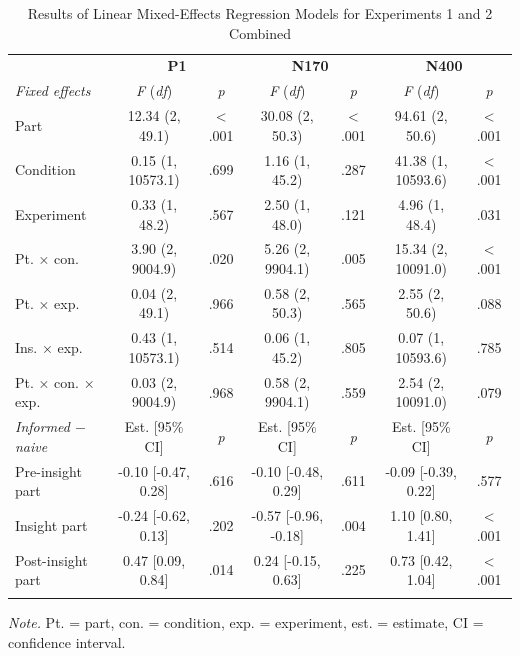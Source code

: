 \documentclass[
  english,
  doc,12pt,twoside,floatsintext]{apa7}
\begin{document}
\begin{table}[tbp]

\begin{center}
\begin{threeparttable}

\caption{\label{tab:joint-table}Results of Linear Mixed-Effects Regression Models for Experiments 1 and 2 Combined\smallskip}

\footnotesize{

\begin{tabular}{lcccccc}
\toprule
 & \multicolumn{2}{c}{\textbf{P1}} & \multicolumn{2}{c}{\textbf{N170}} & \multicolumn{2}{c}{\textbf{N400}} \\
\cmidrule(r){2-3} \cmidrule(r){4-5} \cmidrule(r){6-7}
\textit{Fixed effects} & \textit{F} (\textit{df}) & \textit{p} & \textit{F} (\textit{df}) & \textit{p} & \textit{F} (\textit{df}) & \textit{p}\\
\midrule
Part & 12.34 (2, 49.1) & < .001 & 30.08 (2, 50.3) & < .001 & 94.61 (2, 50.6) & < .001\\
Condition & 0.15 (1, 10573.1) & .699 & 1.16 (1, 45.2) & .287 & 41.38 (1, 10593.6) & < .001\\
Experiment & 0.33 (1, 48.2) & .567 & 2.50 (1, 48.0) & .121 & 4.96 (1, 48.4) & .031\\
Pt. × con. & 3.90 (2, 9004.9) & .020 & 5.26 (2, 9904.1) & .005 & 15.34 (2, 10091.0) & < .001\\
Pt. × exp. & 0.04 (2, 49.1) & .966 & 0.58 (2, 50.3) & .565 & 2.55 (2, 50.6) & .088\\
Ins. × exp. & 0.43 (1, 10573.1) & .514 & 0.06 (1, 45.2) & .805 & 0.07 (1, 10593.6) & .785\\
Pt. × con. × exp. & 0.03 (2, 9004.9) & .968 & 0.58 (2, 9904.1) & .559 & 2.54 (2, 10091.0) & .079\\
\textit{Informed $-$  naive} & Est. [95\% CI] & \textit{p} & Est. [95\% CI] & \textit{p} & Est. [95\% CI] & \textit{p}\\ \midrule
Pre-insight part & -0.10 [-0.47, 0.28] & .616 & -0.10 [-0.48, 0.29] & .611 & -0.09 [-0.39, 0.22] & .577\\
Insight part & -0.24 [-0.62, 0.13] & .202 & -0.57 [-0.96, -0.18] & .004 & 1.10 [0.80, 1.41] & < .001\\
Post-insight part & 0.47 [0.09, 0.84] & .014 & 0.24 [-0.15, 0.63] & .225 & 0.73 [0.42, 1.04] & < .001\\
\bottomrule
\addlinespace
\end{tabular}

}

\begin{tablenotes}[para]
\normalsize{\textit{Note.} Pt. = part, con. = condition, exp. = experiment, est. = estimate, CI = confidence interval.}
\end{tablenotes}

\end{threeparttable}
\end{center}

\end{table}
\end{document}
